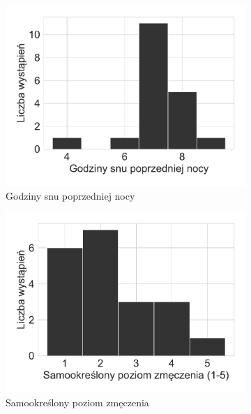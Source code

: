 \documentclass{./assets/wfis}
\begin{document}
\begin{figure}[h!]
\begin{subfigure}[b]{0.45\textwidth}
    \centering
    \includegraphics[width=\columnwidth]{thesis/plots/sleep.pdf}
    \caption{Godziny snu poprzedniej nocy}
    \label{fig:sleep-time}
\end{subfigure}   
\hfill
\begin{subfigure}[b]{0.45\textwidth}
    \centering
    \includegraphics[width=\columnwidth]{thesis/plots/exhaustion_level.pdf}
    \caption{Samookreślony poziom zmęczenia}
    \label{fig:tired}
\end{subfigure}
\begin{subfigure}[b]{0.45\textwidth}
    \centering

\end{subfigure}
\end{figure}
\end{document}
